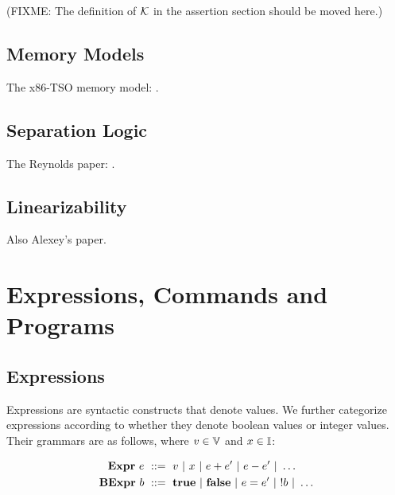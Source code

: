 \documentclass[11pt]{report}
\begin{document}
(FIXME: The definition of $\mathcal{K}$ in the assertion section should be moved here.)


\section{Memory Models} %
\label{sec:memory-models}

The x86-TSO memory model: \cite{DBLP:conf/tphol/OwensSS09}. 


\section{Separation Logic} %
\label{sec:separation-logic}

The Reynolds paper: \cite{DBLP:conf/lics/Reynolds02}. 



\section{Linearizability} %
\label{sec:linearizability}

\cite{DBLP:journals/toplas/HerlihyW90} Also Alexey's paper.


\chapter{Expressions, Commands and Programs}

\section{Expressions} %
\label{sec:expressions}

Expressions are syntactic constructs that denote values. We further categorize expressions according to whether they denote boolean values or integer values. Their grammars are as follows, where $v \in \mathbb{V}$ and $x \in \mathbb{I}$: 

\begin{align*}
	\mathbf{Expr}~e & ~::=~ v ~|~ x ~|~ e + e' ~|~ e - e' ~|~ \ldots \\ 
	\mathbf{BExpr}~b & ~::=~ \mathbf{true} ~|~ \mathbf{false} ~|~ e = e' ~|~ !b ~|~ \ldots \\	
\end{align*}
\end{document}
